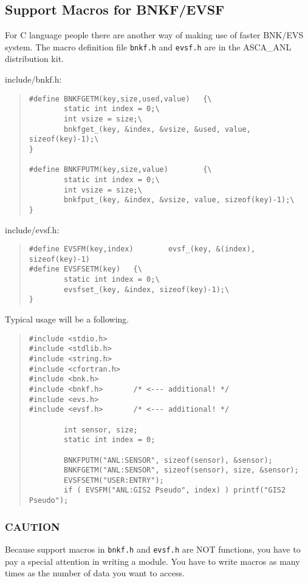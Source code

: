 \subsection{Support Macros for BNKF/EVSF}
For C language people
there are another way of making use of faster BNK/EVS system.
The macro definition file {\tt bnkf.h} and {\tt evsf.h}
are in the ASCA\_ANL distribution kit.

include/bnkf.h:

\begin{quote}\baselineskip 3.2mm\begin{verbatim}
#define BNKFGETM(key,size,used,value)   {\
        static int index = 0;\
        int vsize = size;\
        bnkfget_(key, &index, &vsize, &used, value, sizeof(key)-1);\
}

#define BNKFPUTM(key,size,value)        {\
        static int index = 0;\
        int vsize = size;\
        bnkfput_(key, &index, &vsize, value, sizeof(key)-1);\
}
\end{verbatim}\end{quote}

include/evsf.h:

\begin{quote}\baselineskip 3.2mm\begin{verbatim}
#define EVSFM(key,index)        evsf_(key, &(index), sizeof(key)-1)
#define EVSFSETM(key)   {\
        static int index = 0;\
        evsfset_(key, &index, sizeof(key)-1);\
}
\end{verbatim}\end{quote}

Typical usage will be a following.

\begin{quote}\baselineskip 3.2mm\begin{verbatim}
#include <stdio.h>
#include <stdlib.h>
#include <string.h>
#include <cfortran.h>
#include <bnk.h>
#include <bnkf.h>       /* <--- additional! */
#include <evs.h>
#include <evsf.h>       /* <--- additional! */

        int sensor, size;
        static int index = 0;
        
        BNKFPUTM("ANL:SENSOR", sizeof(sensor), &sensor);
        BNKFGETM("ANL:SENSOR", sizeof(sensor), size, &sensor);
        EVSFSETM("USER:ENTRY");
        if ( EVSFM("ANL:GIS2 Pseudo", index) ) printf("GIS2 Pseudo");
\end{verbatim}\end{quote}

\subsubsection{CAUTION}
Because support macros in {\tt bnkf.h} and {\tt evsf.h} are NOT functions,
you have to pay a special attention in writing a module.
You have to write macros as many times as the number of data
you want to access.

